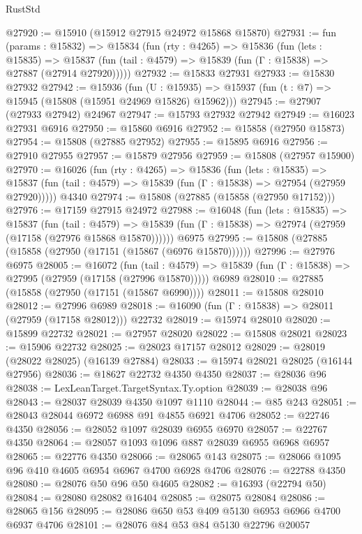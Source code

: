 \begin{lexlean}{RustStd}
\begin{coremodule}
@27920 := @15910 (@15912 @27915 @24972 @15868 @15870)
@27931 := fun (params : @15832) =>
  @15834
    (fun (rty : @4265) =>
    @15836
      (fun (lets : @15835) =>
      @15837 (fun (tail : @4579) => @15839 (fun (Γ : @15838) => @27887 (@27914 @27920)))))
@27932 := @15833 @27931
@27933 := @15830 @27932
@27942 := @15936
    (fun (U : @15935) => @15937 (fun (t : @7) => @15945 (@15808 (@15951 @24969 @15826) @15962)))
@27945 := @27907 (@27933 @27942) @24967
@27947 := @15793 @27932 @27942
@27949 := @16023 @27931 @6916
@27950 := @15860 @6916
@27952 := @15858 (@27950 @15873)
@27954 := @15808 (@27885 @27952)
@27955 := @15895 @6916
@27956 := @27910 @27955
@27957 := @15879 @27956
@27959 := @15808 (@27957 @15900)
@27970 := @16026
    (fun (rty : @4265) =>
    @15836
      (fun (lets : @15835) =>
      @15837 (fun (tail : @4579) => @15839 (fun (Γ : @15838) => @27954 (@27959 @27920)))))
    @4340
@27974 := @15808 (@27885 (@15858 (@27950 @17152)))
@27976 := @17159 @27915 @24972
@27988 := @16048
    (fun (lets : @15835) =>
    @15837
      (fun (tail : @4579) =>
      @15839 (fun (Γ : @15838) => @27974 (@27959 (@17158 (@27976 @15868 @15870))))))
    @6975
@27995 := @15808 (@27885 (@15858 (@27950 (@17151 (@15867 (@6976 @15870))))))
@27996 := @27976 @6975
@28005 := @16072
    (fun (tail : @4579) => @15839 (fun (Γ : @15838) => @27995 (@27959 (@17158 (@27996 @15870)))))
    @6989
@28010 := @27885 (@15858 (@27950 (@17151 (@15867 @6990))))
@28011 := @15808 @28010
@28012 := @27996 @6989
@28018 := @16090 (fun (Γ : @15838) => @28011 (@27959 (@17158 @28012))) @22732
@28019 := @15974 @28010
@28020 := @15899 @22732
@28021 := @27957 @28020
@28022 := @15808 @28021
@28023 := @15906 @22732
@28025 := @28023 @17157 @28012
@28029 := @28019 (@28022 @28025) (@16139 @27884)
@28033 := @15974 @28021 @28025 (@16144 @27956)
@28036 := @18627 @22732 @4350 @4350
@28037 := @28036 @96
@28038 := LexLeanTarget.TargetSyntax.Ty.option
@28039 := @28038 @96
@28043 := @28037 @28039 @4350 @1097 @1110
@28044 := @85 @243
@28051 := @28043 @28044 @6972 @6988 @91 @4855 @6921 @4706
@28052 := @22746 @4350
@28056 := @28052 @1097 @28039 @6955 @6970
@28057 := @22767 @4350
@28064 := @28057 @1093 @1096 @887 @28039 @6955 @6968 @6957
@28065 := @22776 @4350
@28066 := @28065 @143
@28075 := @28066 @1095 @96 @410 @4605 @6954 @6967 @4700 @6928 @4706
@28076 := @22788 @4350
@28080 := @28076 @50 @96 @50 @4605
@28082 := @16393 (@22794 @50)
@28084 := @28080 @28082 @16404
@28085 := @28075 @28084
@28086 := @28065 @156
@28095 := @28086 @650 @53 @409 @5130 @6953 @6966 @4700 @6937 @4706
@28101 := @28076 @84 @53 @84 @5130 @22796 @20057

\end{coremodule}
\end{lexlean}
